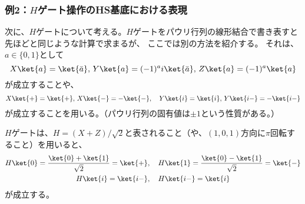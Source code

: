 \documentclass[a4paper,11pt,uplatex]{jsarticle}%
\begin{document}
\subsubsection*{例2：$H$ゲート操作のHS基底における表現}
次に、$H$ゲートについて考える。$H$ゲートをパウリ行列の線形結合で書き表すと先ほどと同じような計算で求まるが、
ここでは別の方法を紹介する。
それは、$a\in\{0,1\}$として
\begin{equation}
  X\ket{a} = \ket{\bar{a}},\,Y\ket{a} = (-1)^ai\ket{\bar{a}},\,Z\ket{a} = (-1)^a\ket{a}
\end{equation}
が成立することや、
\begin{equation}
  X\ket{+} = \ket{+},\,X\ket{-}=-\ket{-},\quad Y\ket{i} = \ket{i},\,Y\ket{i-}=-\ket{i-}
\end{equation}
が成立することを用いる。（パウリ行列の固有値は$\pm 1$という性質がある。）

$H$ゲートは、$H=(X+Z)/\sqrt{2}$と表されること（や、$(1,0,1)$方向に$\pi$回転すること）を用いると、
\begin{gather}
  H\ket{0} = \frac{\ket{0}+\ket{1}}{\sqrt{2}} = \ket{+},\quad H\ket{1} = \frac{\ket{0}-\ket{1}}{\sqrt{2}} = \ket{-} \\
  H\ket{i} = \ket{i-},\quad H\ket{i-} = \ket{i}
\end{gather}
が成立する。
\end{document}

